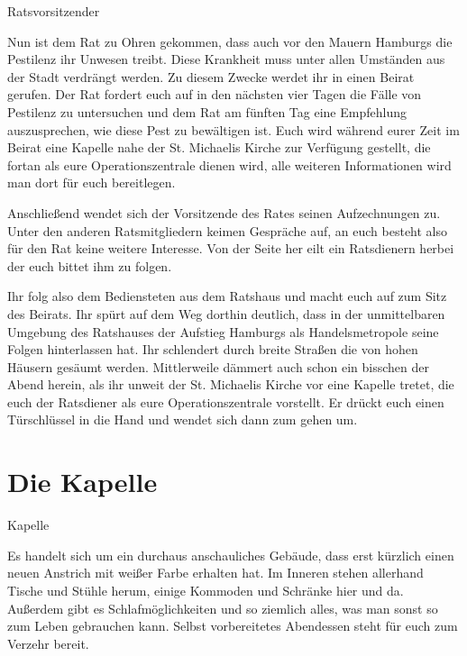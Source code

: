\begin{say-box}{Ratsvorsitzender}

Nun ist dem Rat zu Ohren gekommen, dass auch vor den Mauern Hamburgs die Pestilenz
ihr Unwesen treibt. Diese Krankheit muss unter allen Umständen aus der Stadt
verdrängt werden. Zu diesem Zwecke werdet ihr in einen Beirat gerufen. Der Rat
fordert euch auf in den nächsten vier Tagen die Fälle von Pestilenz zu untersuchen
und dem Rat am fünften Tag eine Empfehlung auszusprechen, wie diese Pest zu
bewältigen ist. Euch wird während eurer Zeit im Beirat eine Kapelle nahe der St.
Michaelis Kirche zur Verfügung gestellt, die fortan als eure Operationszentrale
dienen wird, alle weiteren Informationen wird man dort für euch bereitlegen.

\end{say-box}

Anschließend wendet sich der Vorsitzende des Rates seinen Aufzechnungen zu. Unter
den anderen Ratsmitgliedern keimen Gespräche auf, an euch besteht also für den Rat
keine weitere Interesse. Von der Seite her eilt ein Ratsdienern herbei der euch
bittet ihm zu folgen.

Ihr folg also dem Bediensteten aus dem Ratshaus und macht euch auf zum Sitz des
Beirats. Ihr spürt auf dem Weg dorthin deutlich, dass in der unmittelbaren Umgebung
des Ratshauses der Aufstieg Hamburgs als Handelsmetropole seine Folgen hinterlassen
hat. Ihr schlendert durch breite Straßen die von hohen Häusern gesäumt werden.
Mittlerweile dämmert auch schon ein bisschen der Abend herein, als ihr unweit der
St. Michaelis Kirche vor eine Kapelle tretet, die euch der Ratsdiener als eure
Operationszentrale vorstellt. Er drückt euch einen Türschlüssel in die Hand und
wendet sich dann zum gehen um.

\section{Die Kapelle}
\label{sec:kapelle}

\begin{place-box}{Kapelle}

Es handelt sich um ein durchaus anschauliches Gebäude, dass erst kürzlich einen
neuen Anstrich mit weißer Farbe erhalten hat. Im Inneren stehen allerhand Tische
und Stühle herum, einige Kommoden und Schränke hier und da. Außerdem gibt es
Schlafmöglichkeiten und so ziemlich alles, was man sonst so zum Leben gebrauchen
kann. Selbst vorbereitetes Abendessen steht für euch zum Verzehr bereit.

\end{place-box}

